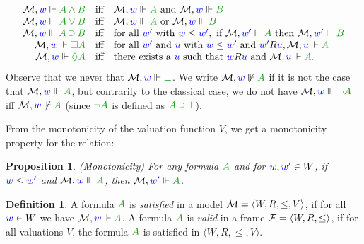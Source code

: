 \documentclass[a4paper]{article}
\theoremstyle{plain}
\newtheorem{proposition}[theorem]{Proposition}
\theoremstyle{definition}
\newtheorem{definition}[theorem]{Definition}
\newcommand*{\AND}{\mathbin{\wedge}}
\newcommand*{\OR}{\mathbin{\vee}}
\newcommand*{\IMP}{\mathbin{\scalebox{.9}{\raise.2ex\hbox{$\supset$}}}}
\newcommand*{\BOX}{\mathord{\Box}}
\newcommand*{\DIA}{\mathord{\Diamond}}
\newcommand*{\fm}[1]{{\color{notgreen}{#1}}}
\newcommand*{\lb}[1]{{\color{blue}{#1}}}
\newcommand*{\accs}[2]{\lb{#1}R\lb{#2}}
\newcommand*{\futs}[2]{\lb{#1}\le{\color{blue}{#2}}}
\newcommand*{\rel}{R}
\begin{document}
\begin{equation}\label{eq:kripke}
	\begin{array}{rcl}
	
		\M, \lb w \Vdash \fm{A \AND B} & \mbox{iff} & \M, \lb w \Vdash \fm A \mbox{ and } \M, \lb w \Vdash \fm B\\
		
		\M, \lb w \Vdash \fm{A \OR B} & \mbox{iff} & \M, \lb w \Vdash \fm A \mbox{ or } \M, \lb w \Vdash \fm B\\
	
		\M, \lb w \Vdash \fm{A \IMP B} & \mbox{iff} & \mbox{for all } \lb{w'} \mbox{ with } \futs w{w'}, \mbox{ if } \M, \lb{w'} \Vdash \fm A \mbox{ then } \M, \lb{w'} \Vdash \fm B\\
		
		\M, \lb w \Vdash \fm{\BOX A} & \mbox{iff} & \mbox{for all } \lb{w'} \mbox{ and } \lb u \mbox{ with } \futs w{w'} \mbox{ and } \accs {w'}u, \M, \lb u \Vdash \fm A \hfill \\ %
		
		\M, \lb w \Vdash \fm{\DIA A} & \mbox{iff} & \mbox{there exists a } \lb u \mbox{ such that } \accs wu \mbox{ and } \M, \lb u \Vdash \fm A.
		
	\end{array}
\end{equation}
Observe that we never that $\M, \lb w \Vdash \fm\bot$. 
%
We write $\M, \lb w \not\Vdash \fm A$ if it is not the case that $\M, \lb w \Vdash \fm A$, but contrarily to the classical case, we do not have $\M, \lb w \Vdash \fm{\neg A}$ iff $\M, \lb w \not\Vdash \fm A$ (since $\fm{\neg A}$ is defined as $\fm{A \IMP \bot}$).

From the monotonicity of the valuation function $V$, we get a monotonicity property for the relation:
\begin{proposition}(Monotonicity) 
	For any formula $\fm A$ and for $\lb w, \lb{w'} \in W$, if $\futs w{w'}$ and $\M, \lb w \Vdash \fm A$, then $\M, \lb{w'} \Vdash \fm A$.
\end{proposition}



\begin{definition}
	A formula $\fm A$ is \emph{satisfied} in a model $\M = \langle W, \rel, \le, V \rangle$, if for all $\lb w \in W$ we have $\M, \lb w \Vdash \fm A$.
	A formula $\fm A$ is \emph{valid} in a frame $\F = \langle W, \rel, \le \rangle$, if for all valuations $V$, the formula $\fm A$ is satisfied in $\langle W, R, \le, V \rangle$.
\end{definition}
\end{document}
